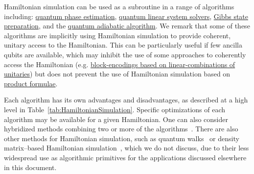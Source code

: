 \begin{refsection}
Hamiltonian simulation can be used as a subroutine in a range of algorithms including: \hyperref[prim:QPE]{quantum phase estimation}, \hyperref[prim:QuantumLinearSystemSolvers]{quantum linear system solvers}, \hyperref[prim:GibbsSampling]{Gibbs state preparation}, and the \hyperref[prim:QuantumAdiabaticAlgorithm]{quantum adiabatic algorithm}. We remark that some of these algorithms are implicitly using Hamiltonian simulation to provide coherent, unitary access to the Hamiltonian. This can be particularly useful if few ancilla qubits are available, which may inhibit the use of some approaches to coherently access the Hamiltonian (e.g. \hyperref[prim:LCU]{block-encodings based on linear-combinations of unitaries}) but does not prevent the use of Hamiltonian simulation based on \hyperref[prim:ProductFormulae]{product formulae}.

\localtableofcontents
{}

Each algorithm has its own advantages and disadvantages, as described at a high level in Table~\ref{tab:HamiltonianSimulation}. Specific optimizations of each algorithm may be available for a given Hamiltonian. One can also consider hybridized methods combining two or more of the algorithms~\cite{low2018HamiltonianInteractionPicture, low2019Multiproduct, Ouyang2020compilation, hagan2022CompositeSimulation, Rajput2022HybridizedMF,watkins2022TimeDependentClockSimulation}. There are also other methods for Hamiltonian simulation, such as quantum walks~\cite{childs2008OnRelContDiscQuantWalk,berry2012BlackHamSimUnitImp,berry2015HamSimNearlyOpt} or density matrix--based Hamiltonian simulation~\cite{lloyd2013QPrincipalCompAnal,kimmel2016hamiltonian}, which we do not discuss, due to their less widespread use as algorithmic primitives for the applications discussed elsewhere in this document.




\end{refsection}
